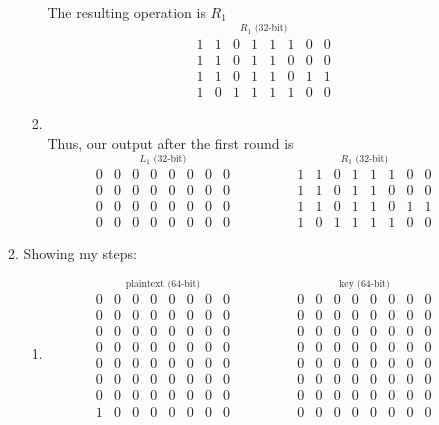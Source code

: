 \documentclass[12pt]{article}
\begin{document}
\begin{enumerate}
\begin{enumerate}
\begin{enumerate}
				The resulting operation is $R_1$
				\[
				\stackrel{\mbox{$R_1$ (32-bit)}}{
					\begin{matrix}
						1&1&0&1&1&1&0&0\\
						1&1&0&1&1&0&0&0\\
						1&1&0&1&1&0&1&1\\
						1&0&1&1&1&1&0&0
					\end{matrix}}
				\]
				
			\item
				\quad\\
				Thus, our output after the first round is
				\[
				\stackrel{\mbox{$L_1$ (32-bit)}}{
					\begin{matrix}
						0&0&0&0&0&0&0&0\\
						0&0&0&0&0&0&0&0\\
						0&0&0&0&0&0&0&0\\
						0&0&0&0&0&0&0&0
					\end{matrix}}\quad\quad\quad\quad
					\stackrel{\mbox{$R_1$ (32-bit)}}{
					\begin{matrix}
						1&1&0&1&1&1&0&0\\
						1&1&0&1&1&0&0&0\\
						1&1&0&1&1&0&1&1\\
						1&0&1&1&1&1&0&0
					\end{matrix}}
				\]
			
			\end{enumerate}
		\item Showing my steps:
			\begin{enumerate}
			\item
				\[
				\stackrel{\mbox{plaintext (64-bit)}}{
				\begin{matrix}
					0&0&0&0&0&0&0&0\\ 
					0&0&0&0&0&0&0&0\\
					0&0&0&0&0&0&0&0\\
					0&0&0&0&0&0&0&0\\
					0&0&0&0&0&0&0&0\\
					0&0&0&0&0&0&0&0\\
					0&0&0&0&0&0&0&0\\
					1&0&0&0&0&0&0&0
				\end{matrix}}\quad\quad\quad\quad
				\stackrel{\mbox{key (64-bit)}}{
				\begin{matrix}
					0&0&0&0&0&0&0&0\\ 
					0&0&0&0&0&0&0&0\\
					0&0&0&0&0&0&0&0\\
					0&0&0&0&0&0&0&0\\
					0&0&0&0&0&0&0&0\\
					0&0&0&0&0&0&0&0\\
					0&0&0&0&0&0&0&0\\
					0&0&0&0&0&0&0&0
				\end{matrix}}
				\]
				

\end{enumerate}
\end{enumerate}
\end{enumerate}
\end{document}
